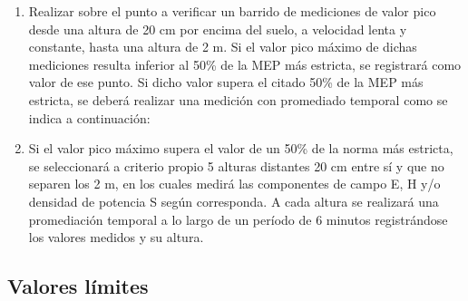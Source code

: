 \begin{enumerate}
    \item Realizar sobre el punto a verificar un barrido de mediciones de valor pico desde una altura de 20 cm por encima del suelo, a velocidad lenta y constante, hasta una altura de 2 m. Si el valor pico máximo de dichas mediciones resulta inferior al 50\%  de la MEP más estricta, se registrará como valor de ese punto. Si dicho valor supera el citado 50\% de la MEP más estricta, se deberá realizar una medición con promediado temporal como se indica a continuación:
    \item Si el valor pico máximo supera el valor de un 50\% de la norma más estricta, se seleccionará a criterio propio 5 alturas distantes 20 cm entre sí y que no separen los 2 m, en los cuales medirá las componentes de campo E, H y/o densidad de potencia S según corresponda. A cada altura se realizará una promediación temporal a lo largo de un período de 6 minutos registrándose los valores medidos y su altura.
\end{enumerate}


\subsection*{Valores límites}

